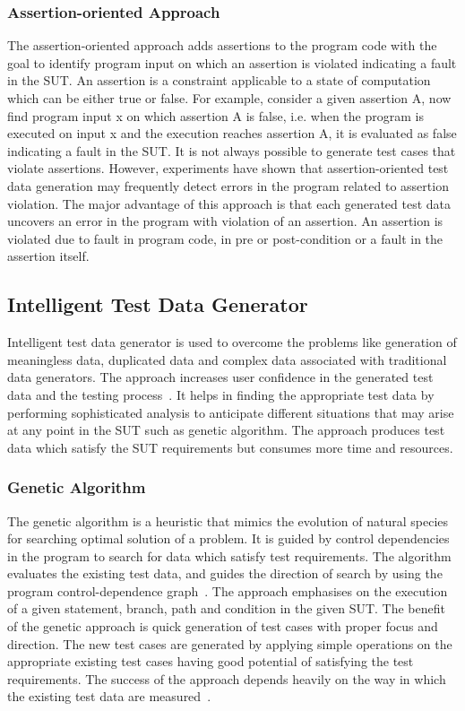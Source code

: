 \subsubsection{Assertion-oriented Approach}
The assertion-oriented approach adds assertions to the program code with the goal to identify program input on which an assertion is violated indicating a fault in the SUT. An assertion is a constraint applicable to a state of computation which can be either true or false. For example, consider a given assertion A, now find program input x on which assertion A is false, i.e. when the program is executed on input x and the execution reaches assertion A, it is evaluated as false indicating a fault in the SUT. It is not always possible to generate test cases that violate assertions. However, experiments have shown that assertion-oriented test data generation may frequently detect errors in the program related to assertion violation. The major advantage of this approach is that each generated test data uncovers an error in the program with violation of an assertion. An assertion is violated due to fault in program code, in pre or post-condition or a fault in the assertion itself.



\subsection{Intelligent Test Data Generator}
\label{sec:intelligent_2}
Intelligent test data generator is used to overcome the problems like generation of meaningless data, duplicated data and complex data associated with traditional data generators. The approach increases user confidence in the generated test data and the testing process~\cite{ramamoorthy1975testing}. It helps in finding the appropriate test data by performing sophisticated analysis to anticipate different situations that may arise at any point in the SUT such as genetic algorithm. The approach produces test data which satisfy the SUT requirements but consumes more time and resources.

\subsubsection{Genetic Algorithm}
The genetic algorithm is a heuristic that mimics the evolution of natural species for searching optimal solution of a problem. It is guided by control dependencies in the program to search for data which satisfy test requirements. The algorithm evaluates the existing test data, and guides the direction of search by using the program control-dependence graph~\cite{pargas1999test}. The approach emphasises on the execution of a given statement, branch, path and condition in the given SUT. The benefit of the genetic approach is quick generation of test cases with proper focus and direction. The new test cases are generated by applying simple operations on the appropriate existing test cases having good potential of satisfying the test requirements. The success of the approach depends heavily on the way in which the existing test data are measured~\cite{pargas1999test}.

